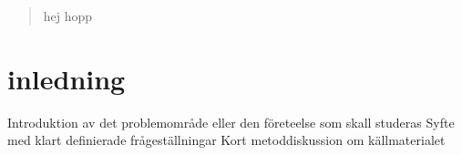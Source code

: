 \begin{abstract}
	hej hopp
\end{abstract}	
	
	
\section{inledning}	
Introduktion av det problemområde eller den företeelse som skall studeras
Syfte med klart definierade frågeställningar
Kort metoddiskussion om källmaterialet